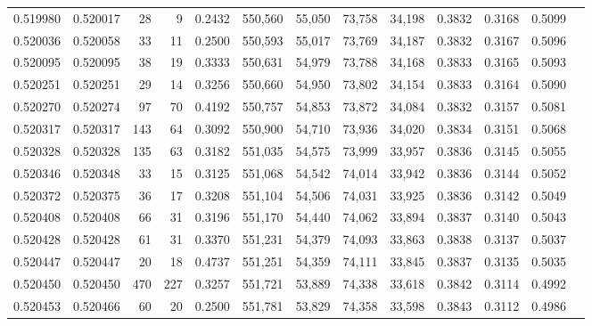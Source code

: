 \begin{tabular}{rrrrrrrrrrrrr}
0.519980 & 0.520017 &    28 &     9 &                                     0.2432 & 550,560 &  55,050 &  73,758 &  34,198 & 0.3832 & 0.3168 & 0.5099 \\
0.520036 & 0.520058 &    33 &    11 &                                     0.2500 & 550,593 &  55,017 &  73,769 &  34,187 & 0.3832 & 0.3167 & 0.5096 \\
0.520095 & 0.520095 &    38 &    19 &                                     0.3333 & 550,631 &  54,979 &  73,788 &  34,168 & 0.3833 & 0.3165 & 0.5093 \\
0.520251 & 0.520251 &    29 &    14 &                                     0.3256 & 550,660 &  54,950 &  73,802 &  34,154 & 0.3833 & 0.3164 & 0.5090 \\
0.520270 & 0.520274 &    97 &    70 &                                     0.4192 & 550,757 &  54,853 &  73,872 &  34,084 & 0.3832 & 0.3157 & 0.5081 \\
0.520317 & 0.520317 &   143 &    64 &                                     0.3092 & 550,900 &  54,710 &  73,936 &  34,020 & 0.3834 & 0.3151 & 0.5068 \\
0.520328 & 0.520328 &   135 &    63 &                                     0.3182 & 551,035 &  54,575 &  73,999 &  33,957 & 0.3836 & 0.3145 & 0.5055 \\
0.520346 & 0.520348 &    33 &    15 &                                     0.3125 & 551,068 &  54,542 &  74,014 &  33,942 & 0.3836 & 0.3144 & 0.5052 \\
0.520372 & 0.520375 &    36 &    17 &                                     0.3208 & 551,104 &  54,506 &  74,031 &  33,925 & 0.3836 & 0.3142 & 0.5049 \\
0.520408 & 0.520408 &    66 &    31 &                                     0.3196 & 551,170 &  54,440 &  74,062 &  33,894 & 0.3837 & 0.3140 & 0.5043 \\
0.520428 & 0.520428 &    61 &    31 &                                     0.3370 & 551,231 &  54,379 &  74,093 &  33,863 & 0.3838 & 0.3137 & 0.5037 \\
0.520447 & 0.520447 &    20 &    18 &                                     0.4737 & 551,251 &  54,359 &  74,111 &  33,845 & 0.3837 & 0.3135 & 0.5035 \\
0.520450 & 0.520450 &   470 &   227 &                                     0.3257 & 551,721 &  53,889 &  74,338 &  33,618 & 0.3842 & 0.3114 & 0.4992 \\
0.520453 & 0.520466 &    60 &    20 &                                     0.2500 & 551,781 &  53,829 &  74,358 &  33,598 & 0.3843 & 0.3112 & 0.4986 \\

\end{tabular}

